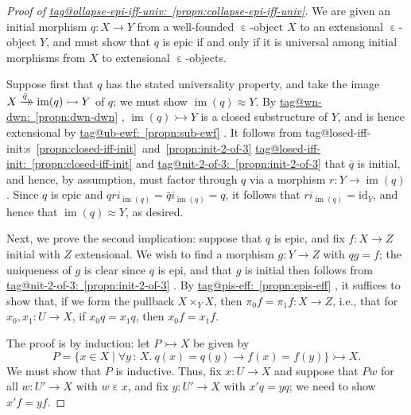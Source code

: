 \documentclass{amsart}
\makeatletter
\newcommand\ein{\mathrel{\varepsilon}}
\newcommand\id{\mathrm{id}}
\newcommand\im{\operatorname{im}}
\newcommand\set[2][]{#1\{ #2 #1\}}
\newcommand\tolon{{\,:\,}}
\newcommand{\toox}[2][]{\xrightarrow[#1]{#2}\mathrel{\mkern-14mu}\rightarrow}
\newcommand\tto{\rightarrowtail}
\newcommand\tagword[1]{\csname tag@#1\endcsname}
\def\label@tag#1:#2\@nil{#1}
\newcommand\labeltag[1]{\label@tag#1:\@nil}
\newcommand\jref[1]{%
  \texorpdfstring%
    {\hyperref[#1]{\tagword{\labeltag{#1}}~\ref*{#1}}}%
    {\tagword{\labeltag{#1}}~\ref*{#1}}%
}
\newcommand\jrefs[2]{%
  \ifthenelse{\equal{\labeltag{#1}}{\labeltag{#2}}}%
  {%
    \texorpdfstring%
      {\tagword{\labeltag{#1}}s~\ref{#1}~and~\ref{#2}}%
      {\tagword{\labeltag{#1}}s~\ref*{#1}~and~\ref*{#2}}%
  }{\jref{#1} and \jref{#2}}%
}
\theoremstyle{definition}
\theoremstyle{remark}
\theoremstyle{plainwithref}
\makeatother
\begin{document}
\begin{proof}[Proof of \jref{propn:collapse-epi-iff-univ}] \label{proof:collapse-epi-iff-univ}
  We are given an initial morphism \( q \colon X \to Y \) from a well-founded \( \ein \)-object \( X \) to an extensional \( \ein \)-object \( Y \), and must show that \( q \) is epic if and only if it is universal among initial morphisms from \( X \) to extensional \( \ein \)-objects.

  Suppose first that \( q \) has the stated universality property, and take the image \( X \toox{\bar q} \im(q) \tto Y \) of \( q \); we must show \( \im(q) \approx Y \).
  By \jref{propn:dwn-dwn}, \( \im(q) \tto Y \) is a closed substructure of \( Y \), and is hence extensional by \jref{propn:sub-ewf}.
  It follows from \jrefs{propn:closed-iff-init}{propn:init-2-of-3} that \( \bar q \) is initial, and hence, by assumption, must factor through \( q \) via a morphism \( r \colon Y \to \im(q) \).
  Since \( q \) is epic and \( q r i_{\im(q)} = \bar q i_{\im(q)} = q \), it follows that \( r i_{\im(q)} = \id_Y \), and hence that \( \im(q) \approx Y \), as desired.

  Next, we prove the second implication: suppose that \( q \) is epic, and fix \( f \colon X \to Z \) initial with \( Z \) extensional.
  We wish to find a morphism \( g \colon Y \to Z \) with \( q g = f \); the uniqueness of \( g \) is clear since \( q \) is epi, and that \( g \) is initial then follows from \jref{propn:init-2-of-3}.
  By \jref{propn:epis-eff}, it suffices to show that, if we form the pullback \( X \times_Y X \), then \( \pi_0 f = \pi_1 f \colon X \to Z \), i.e., that for \( x_0, x_1 \colon U \to X \), if \( x_0 q = x_1 q \), then \( x_0 f = x_1 f \).

  The proof is by induction: let \( P \tto X \) be given by
  \[
    P = \set{x \in X \mid \forall y \tolon X.\ q(x) = q(y) \to f(x) = f(y)} \tto X.
  \]
  We must show that \( P \) is inductive.
  Thus, fix \( x \colon U \to X \) and suppose that \( P w \) for all \( w \colon U' \to X \) with \( w \ein x \), and fix \( y \colon U' \to X \) with \( x' q = y q \); we need to show \( x' f = y f \).


\end{proof}
\end{document}
